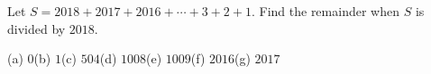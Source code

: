 Let $S=2018+2017+2016+\cdots+3+2+1$. Find the remainder when $S$ is divided by $2018$.

(a) $0$\quad (b) $1$\quad (c) $504$\quad (d) $1008$\quad (e) $1009$\quad (f) $2016$\quad (g) $2017$
